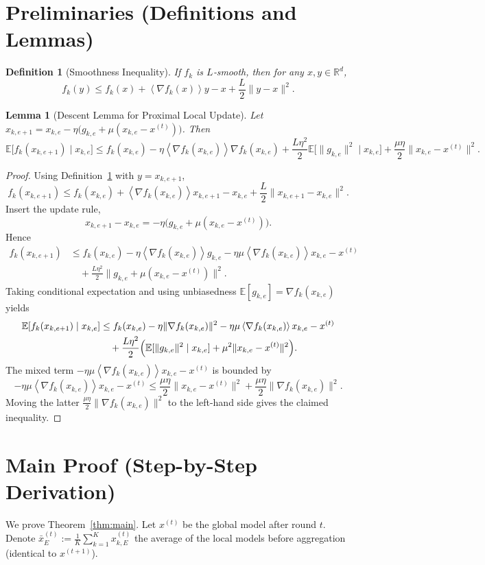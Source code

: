 \documentclass[11pt]{article}
\newtheorem{lemma}{Lemma}
\newtheorem{definition}{Definition}
\newcommand{\E}{\mathbb{E}}
\newcommand{\R}{\mathbb{R}}
\newcommand{\inner}[1]{\left\langle#1\right\rangle}
\begin{document}
\section*{Preliminaries (Definitions and Lemmas)}
\begin{definition}[Smoothness Inequality]\label{def:smooth}
If $f_k$ is $L$‑smooth, then for any $x,y\in\R^{d}$,
\[
f_k(y)\le f_k(x)+\inner{\nabla f_k(x)}{y-x}+\frac{L}{2}\|y-x\|^{2}.
\]
\end{definition}
\begin{lemma}[Descent Lemma for Proximal Local Update]\label{lem:descent}
Let $x_{k,e+1}=x_{k,e}-\eta\bigl(g_{k,e}+\mu(x_{k,e}-x^{(t)})\bigr)$. Then
\[
\E\bigl[f_k(x_{k,e+1})\mid x_{k,e}\bigr]
\le
f_k(x_{k,e})-\eta\inner{\nabla f_k(x_{k,e})}{\nabla f_k(x_{k,e})}
+\frac{L\eta^{2}}{2}\E\!\bigl[\|g_{k,e}\|^{2}\mid x_{k,e}\bigr]
+\frac{\mu\eta}{2}\|x_{k,e}-x^{(t)}\|^{2}.
\]
\end{lemma}
\begin{proof}
Using Definition~\ref{def:smooth} with $y=x_{k,e+1}$,
\[
f_k(x_{k,e+1})\le f_k(x_{k,e})+\inner{\nabla f_k(x_{k,e})}{x_{k,e+1}-x_{k,e}}
+\frac{L}{2}\|x_{k,e+1}-x_{k,e}\|^{2}.
\]
Insert the update rule,
\[
x_{k,e+1}-x_{k,e}= -\eta\bigl(g_{k,e}+\mu(x_{k,e}-x^{(t)})\bigr).
\]
Hence
\[
\begin{aligned}
f_k(x_{k,e+1})
&\le f_k(x_{k,e})-\eta\inner{\nabla f_k(x_{k,e})}{g_{k,e}}
-\eta\mu\inner{\nabla f_k(x_{k,e})}{x_{k,e}-x^{(t)}}\\
&\quad+\frac{L\eta^{2}}{2}\|g_{k,e}+\mu(x_{k,e}-x^{(t)})\|^{2}.
\end{aligned}
\]
Taking conditional expectation and using unbiasedness $\E[g_{k,e}]=\nabla f_k(x_{k,e})$ yields
\[
\begin{aligned}
\E[f_k(x_{k,e+1})\mid x_{k,e}]
&\le f_k(x_{k,e})-\eta\|\nabla f_k(x_{k,e})\|^{2}
-\eta\mu\inner{\nabla f_k(x_{k,e})}{x_{k,e}-x^{(t)}}\\
&\quad+\frac{L\eta^{2}}{2}\Bigl(\E[\|g_{k,e}\|^{2}\mid x_{k,e}]
+\mu^{2}\|x_{k,e}-x^{(t)}\|^{2}\Bigr).
\end{aligned}
\]
The mixed term $-\eta\mu\inner{\nabla f_k(x_{k,e})}{x_{k,e}-x^{(t)}}$ is bounded by
\[
-\eta\mu\inner{\nabla f_k(x_{k,e})}{x_{k,e}-x^{(t)}}
\le \frac{\mu\eta}{2}\|x_{k,e}-x^{(t)}\|^{2}
+\frac{\mu\eta}{2}\|\nabla f_k(x_{k,e})\|^{2}.
\]
Moving the latter $\frac{\mu\eta}{2}\|\nabla f_k(x_{k,e})\|^{2}$ to the left-hand side gives the claimed inequality. \qedhere
\end{proof}

\section*{Main Proof (Step-by-Step Derivation)}
We prove Theorem~\ref{thm:main}. Let $x^{(t)}$ be the global model after round $t$.
Denote $\bar{x}^{(t)}_{E}:=\frac1K\sum_{k=1}^{K}x^{(t)}_{k,E}$ the average of the local models before aggregation (identical to $x^{(t+1)}$).
\end{document}

